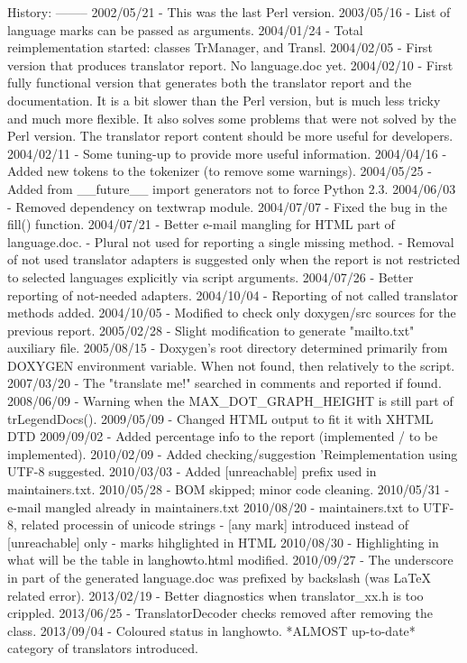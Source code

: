 \begin{DoxyVerb}
  History:
  --------
  2002/05/21 - This was the last Perl version.
  2003/05/16 - List of language marks can be passed as arguments.
  2004/01/24 - Total reimplementation started: classes TrManager, and Transl.
  2004/02/05 - First version that produces translator report. No language.doc yet.
  2004/02/10 - First fully functional version that generates both the translator
               report and the documentation. It is a bit slower than the
               Perl version, but is much less tricky and much more flexible.
               It also solves some problems that were not solved by the Perl
               version. The translator report content should be more useful
               for developers.
  2004/02/11 - Some tuning-up to provide more useful information.
  2004/04/16 - Added new tokens to the tokenizer (to remove some warnings).
  2004/05/25 - Added from __future__ import generators not to force Python 2.3.
  2004/06/03 - Removed dependency on textwrap module.
  2004/07/07 - Fixed the bug in the fill() function.
  2004/07/21 - Better e-mail mangling for HTML part of language.doc.
             - Plural not used for reporting a single missing method.
             - Removal of not used translator adapters is suggested only
               when the report is not restricted to selected languages
               explicitly via script arguments.
  2004/07/26 - Better reporting of not-needed adapters.
  2004/10/04 - Reporting of not called translator methods added.
  2004/10/05 - Modified to check only doxygen/src sources for the previous report.
  2005/02/28 - Slight modification to generate "mailto.txt" auxiliary file.
  2005/08/15 - Doxygen's root directory determined primarily from DOXYGEN
               environment variable. When not found, then relatively to the script.
  2007/03/20 - The "translate me!" searched in comments and reported if found.
  2008/06/09 - Warning when the MAX_DOT_GRAPH_HEIGHT is still part of trLegendDocs().
  2009/05/09 - Changed HTML output to fit it with XHTML DTD
  2009/09/02 - Added percentage info to the report (implemented / to be implemented).
  2010/02/09 - Added checking/suggestion 'Reimplementation using UTF-8 suggested.
  2010/03/03 - Added [unreachable] prefix used in maintainers.txt.
  2010/05/28 - BOM skipped; minor code cleaning.
  2010/05/31 - e-mail mangled already in maintainers.txt
  2010/08/20 - maintainers.txt to UTF-8, related processin of unicode strings
             - [any mark] introduced instead of [unreachable] only
             - marks hihglighted in HTML
  2010/08/30 - Highlighting in what will be the table in langhowto.html modified.
  2010/09/27 - The underscore in \latexonly part of the generated language.doc
               was prefixed by backslash (was LaTeX related error).
  2013/02/19 - Better diagnostics when translator_xx.h is too crippled.
  2013/06/25 - TranslatorDecoder checks removed after removing the class.
  2013/09/04 - Coloured status in langhowto. *ALMOST up-to-date* category
               of translators introduced.\end{DoxyVerb}
 

